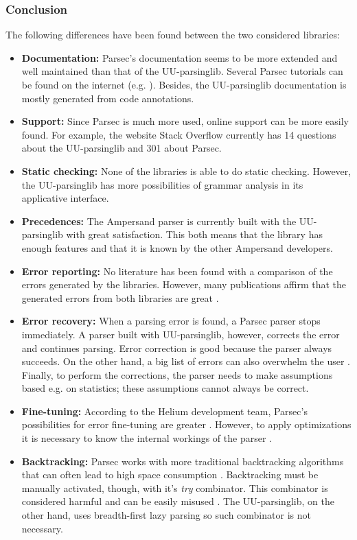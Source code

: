 \subsubsection{Conclusion}
The following differences have been found between the two considered libraries:
\begin{itemize}
	\item \textbf{Documentation:} Parsec's documentation seems to be more extended and well maintained than that of the UU-parsinglib.
		Several Parsec tutorials can be found on the internet (e.g. ).
		Besides, the UU-parsinglib documentation is mostly generated from code annotations.
	\item \textbf{Support:} Since Parsec is much more used, online support can be more easily found.
		For example, the website Stack Overflow currently has 14 questions about the UU-parsinglib and 301 about Parsec.
	\item \textbf{Static checking:} None of the libraries is able to do static checking.
		However, the UU-parsinglib has more possibilities of grammar analysis in its applicative interface.
	\item \textbf{Precedences:} The Ampersand parser is currently built with the UU-parsinglib with great satisfaction.
		This both means that the library has enough features and that it is known by the other Ampersand developers.
	\item \textbf{Error reporting:} No literature has been found with a comparison of the errors generated by the libraries.
		However, many publications affirm that the generated errors from both libraries are great .
	\item \textbf{Error recovery:} When a parsing error is found, a Parsec parser stops immediately.
		A parser built with UU-parsinglib, however, corrects the error and continues parsing.
		Error correction is good because the parser always succeeds.
		On the other hand, a big list of errors can also overwhelm the user .
		Finally, to perform the corrections, the parser needs to make assumptions based e.g. on statistics;
		these assumptions cannot always be correct.
	\item \textbf{Fine-tuning:} According to the Helium development team, Parsec's possibilities for error fine-tuning are greater .
		However, to apply optimizations it is necessary to know the internal workings of the parser .
	\item \textbf{Backtracking:} Parsec works with more traditional backtracking algorithms  that can often lead to high space consumption .
		Backtracking must be manually activated, though, with it's \textit{try} combinator.
    This combinator is considered harmful and can be easily misused .
		The UU-parsinglib, on the other hand, uses breadth-first lazy parsing  so such combinator is not necessary.
    

\end{itemize}
